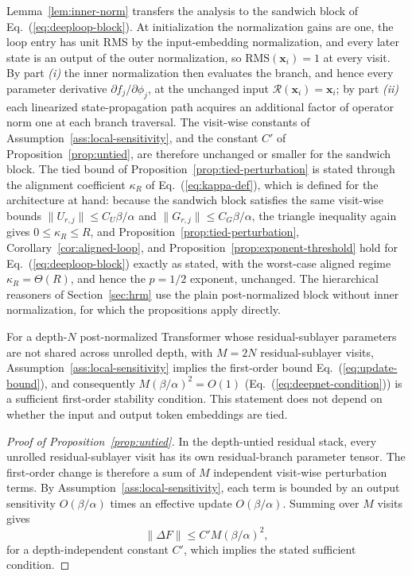 \documentclass[11pt]{airesearch}
\begin{document}
Lemma~\ref{lem:inner-norm} transfers the analysis to the sandwich block of
Eq.~(\ref{eq:deeploop-block}). At initialization the normalization gains are
one, the loop entry has unit RMS by the input-embedding normalization, and
every later state is an output of the outer normalization, so
$\mathrm{RMS}(\mathbf{x}_i)=1$ at every visit. By part \emph{(i)} the inner
normalization then evaluates the branch, and hence every parameter derivative
$\partial f_j/\partial\phi_j$, at the unchanged input
$\mathcal{R}(\mathbf{x}_i)=\mathbf{x}_i$; by part \emph{(ii)} each linearized
state-propagation path acquires an additional factor of operator norm one at
each branch traversal. The visit-wise constants of
Assumption~\ref{ass:local-sensitivity}, and the constant $C'$ of
Proposition~\ref{prop:untied}, are therefore unchanged or smaller for the
sandwich block. The tied bound of Proposition~\ref{prop:tied-perturbation} is
stated through the alignment coefficient $\kappa_R$ of
Eq.~(\ref{eq:kappa-def}), which is defined for the architecture at hand:
because the sandwich block satisfies the same visit-wise bounds
$\|U_{r,j}\|\le C_U\beta/\alpha$ and $\|G_{r,j}\|\le C_G\beta/\alpha$, the
triangle inequality again gives $0\le\kappa_R\le R$, and
Proposition~\ref{prop:tied-perturbation},
Corollary~\ref{cor:aligned-loop}, and
Proposition~\ref{prop:exponent-threshold} hold for
Eq.~(\ref{eq:deeploop-block}) exactly as stated, with the worst-case aligned
regime $\kappa_R=\Theta(R)$, and hence the $p=1/2$ exponent, unchanged. The
hierarchical reasoners of Section~\ref{sec:hrm} use the plain post-normalized
block without inner normalization, for which the propositions apply
directly.

\begin{proposition}
\label{prop:untied}
For a depth-$N$ post-normalized Transformer whose residual-sublayer parameters
are not shared across unrolled depth, with $M=2N$ residual-sublayer visits,
Assumption~\ref{ass:local-sensitivity} implies the first-order bound
Eq.~(\ref{eq:update-bound}), and consequently $M(\beta/\alpha)^2=O(1)$
(Eq.~(\ref{eq:deepnet-condition})) is a sufficient first-order stability
condition. This statement does not depend on whether the input and output token
embeddings are tied.
\end{proposition}

\begin{proof}[Proof of Proposition~\ref{prop:untied}]
In the depth-untied residual stack, every unrolled residual-sublayer visit has
its own residual-branch parameter tensor. The first-order change is therefore a
sum of $M$ independent visit-wise
perturbation terms. By Assumption~\ref{ass:local-sensitivity}, each term is
bounded by an output sensitivity $O(\beta/\alpha)$ times an effective update
$O(\beta/\alpha)$. Summing over $M$ visits gives
\[
  \|\Delta F\|
  \le C' M (\beta/\alpha)^2,
\]
for a depth-independent constant $C'$, which implies the stated sufficient
condition.
\end{proof}
\end{document}
